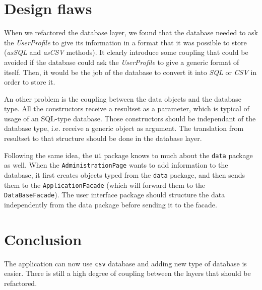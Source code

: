 \documentclass[a4paper,10pt]{article}
\begin{document}
\section{Design flaws}

When we refactored the database layer, we found that the database needed to ask the \textit{UserProfile} to give its information in a format that it was possible to store (\textit{asSQL} and \textit{asCSV} methods). It clearly introduce some coupling that could be
avoided if the database could ask the \textit{UserProfile} to give a generic format of itself. Then, it would be the job of the database to convert it into \textit{SQL} or \textit{CSV} in order to store it.

An other problem is the coupling between the data objects and the database type.
All the constructors receive a resultset as a parameter, which is typical of usage of an SQL-type database.
Those constructors should be independant of the database type, i.e. receive a generic object as argument.
The translation from resultset to that structure should be done in the database layer.

Following the same idea, the \texttt{ui} package knows to much about the \texttt{data} package as well.
When the \texttt{AdministrationPage} wants to add information to the database, it first creates objects typed from the \texttt{data} package, and then sends them to the \texttt{ApplicationFacade} (which will forward them to the \texttt{DataBaseFacade}).
The user interface package should structure the data independently from the data package before sending it to the facade.


\section{Conclusion}
The application can now use \texttt{csv} database and adding new type of database is easier.
There is still a high degree of coupling between the layers that should be refactored.

\end{document}
